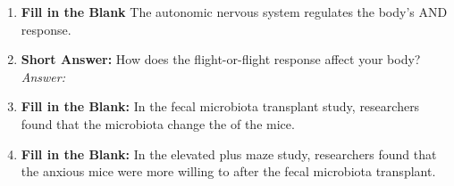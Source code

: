 \begin{enumerate}[label=\textbf{Q1.1.\arabic*}]
      \item \textbf{Fill in the Blank} The autonomic nervous system regulates the body's \underline{\hspace{3cm}} AND \underline{\hspace{3cm}} response. \\

      \item \textbf{Short Answer:} How does the flight-or-flight response affect your body? \\
            \textit{Answer:} \\%

      \item \textbf{Fill in the Blank:} In the fecal microbiota transplant study, researchers found that the microbiota change the \underline{\hspace{3cm}} of the mice. \\

      \item \textbf{Fill in the Blank:} In the elevated plus maze study, researchers found that the anxious mice were more willing to \underline{\hspace{3cm}} after the fecal microbiota transplant. \\
\end{enumerate}

